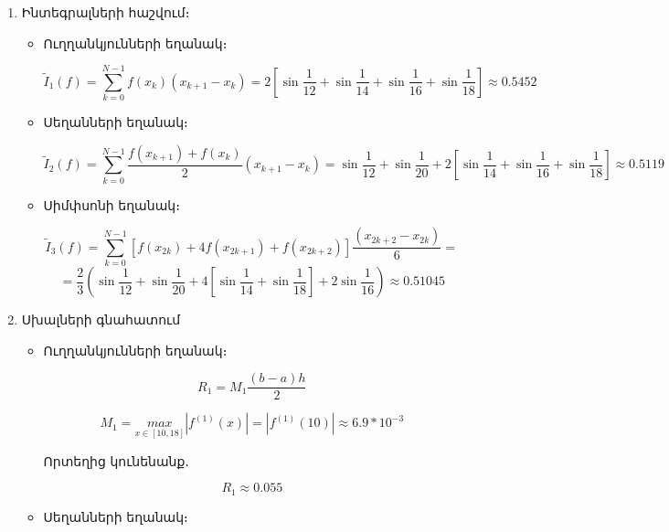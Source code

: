 \documentclass{article}
\begin{document}
\begin{enumerate}

\item

Ինտեգրալների հաշվում։

\begin{itemize}


\item Ուղղանկյունների եղանակ։

$$\tilde{I}_{1}\left(f\right) = \sum_{k = 0}^{N - 1}f\left( x_{k}\right)\left(x_{k + 1} - x_{k}\right) = 2\left[\sin\dfrac{1}{12} + \sin\dfrac{1}{14} +
\sin\dfrac{1}{16} + \sin\dfrac{1}{18}\right] \approx 0.5452$$



\item Սեղանների եղանակ։

$$\tilde{I}_{2}\left(f\right) = \sum_{k = 0}^{N - 1} \dfrac{f\left(x_{k+1}\right) + f\left(x_{k}\right)}{2}\left(x_{k + 1} - x_{k}\right) = \sin\dfrac{1}{12} + \sin\dfrac{1}{20} +
2 \left[\sin\dfrac{1}{14} + \sin\dfrac{1}{16} + \sin\dfrac{1}{18} \right]\approx 0.5119$$

\item

Սիմփսոնի եղանակ։

$$\tilde{I}_{3}\left(f\right) = \sum_{k = 0}^{N - 1} \left[f\left(x_{2k}\right) + 4f\left(x_{2k+1}\right)  + f\left(x_{2k+2}\right)\right]\dfrac{\left(x_{2k + 2} - x_{2k}\right)}{6} = $$
$$ = \dfrac{2}{3}\left(\sin\dfrac{1}{12} + \sin\dfrac{1}{20} + 4\left[\sin\dfrac{1}{14} + \sin\dfrac{1}{18}\right] + 2\sin\dfrac{1}{16}\right) \approx 0.51045$$


\end{itemize}


\item Սխալների գնահատում

\begin{itemize}


\item Ուղղանկյունների եղանակ։
		
		$$R_1 = M_{1} \dfrac{\left(b - a\right)h}{2}$$

		$$M_{1} = \underset{x \in \left[10, 18\right]}{max}\left|f^{\left(1\right)}\left(x\right)\right| = \left|f^{\left(1\right)}\left(10\right)\right| \approx 6.9 * 10^{-3}$$

		Որտեղից կունենանք․

		$$R_1 \approx 0.055$$

\item Սեղանների եղանակ։
		

\end{itemize}
\end{enumerate}
\end{document}
